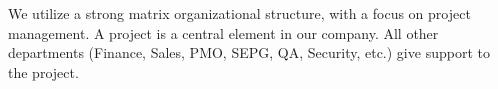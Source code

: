 We utilize a strong matrix organizational structure, with a focus
on project management. A project is a central element in our company.
All other departments (Finance, Sales, PMO, SEPG, QA, Security, etc.)
give support to the project.
